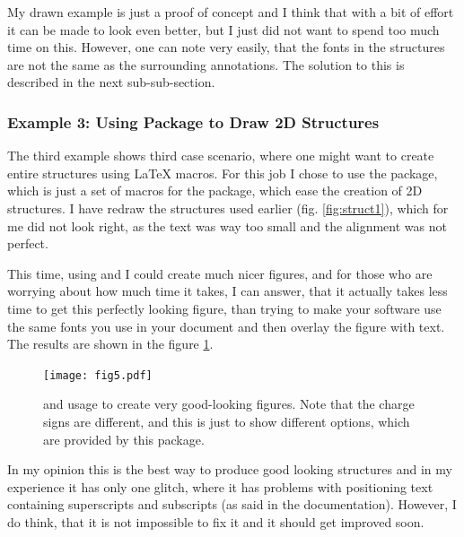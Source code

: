\documentclass[
]{scrartcl}
\begin{document}
My drawn example is just a proof of concept and I think that with a bit of
    effort it can be made to look even better, but I just did not want to spend
    too much time on this.
%
However, one can note very easily, that the fonts in the structures are not the
    same as the surrounding annotations.
%
The solution to this is described in the next sub-sub-section.

%
\clearpage
\subsubsection{Example 3: Using  Package to Draw 2D Structures}

%
The third example shows third case scenario, where one might want to create
    entire structures using \LaTeX{} macros.
%
For this job I chose to use the  package, which is just a set of
    macros for the  package, which ease the creation of 2D structures.
%
I have redraw the structures used earlier (fig. \ref{fig:struct1}), which for
    me did not look right, as the text was way too small and the alignment was
    not perfect.

%
This time, using  and  I could create much nicer figures,
    and for those who are worrying about how much time it takes, I can answer,
    that it actually takes less time to get this perfectly looking figure, than
    trying to make your software use the same fonts you use in your document and
    then overlay the figure with text.
%
The results are shown in the figure \ref{fig:chemfig}.

\begin{figure}[htpb]
    \centering
    \texttt{[image: fig5.pdf]}
%    
    \caption{
     and  usage to create very good-looking
        figures.
    Note that the charge signs are different, and this is just to
        show different options, which are provided by this package.}
    \label{fig:chemfig}
\end{figure}

%
In my opinion this is the best way to produce good looking structures and in my
    experience it has only one glitch, where it has problems with positioning
    text containing superscripts and subscripts (as said in the documentation).
%
However, I do think, that it is not impossible to fix it and it should get
    improved soon.

\clearpage
\end{document}
